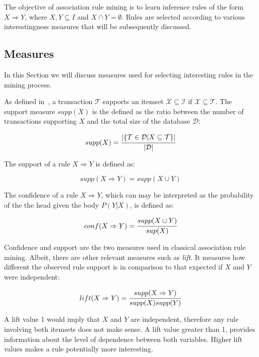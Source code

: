 The objective of association rule mining is to learn inference rules of the form $X \Rightarrow Y$, where $X,Y
\subseteq I$ and $X \cap Y = \emptyset$. Rules are selected according to various interestingness measures that will be
subsequently discussed.

\subsection{Measures}

In this Section we will discuss measures used for selecting interesting rules in the mining process.

As defined in~\citet{Agrawal:1993:MAR:170036.170072}, a transaction $\mathcal{T}$ supports an itemset
$\mathcal{X} \subseteq \mathcal{I}$ if $\mathcal{X} \subseteq
\mathcal{T}$. The support measure $supp(X)$ is the defined as the ratio between the number of transactions supporting
$X$ and the total size of the database $\mathcal{D}$:

\begin{equation}
 supp(X)=\cfrac{|\{ \mathcal{T} \in \mathcal{D} | X \subseteq \mathcal{T} \}|}{|\mathcal{D}|}
\end{equation}

The support of a rule $X \Rightarrow Y$ is defined as:

\begin{equation}
 supp(X \Rightarrow Y)=supp(X \cup Y)
\end{equation}

The confidence of a rule $X \Rightarrow Y$, which can may be interpreted as the probability of the the head given the
body $P(Y|X)$, is defined as:

\begin{equation}
 conf(X \Rightarrow Y)=\cfrac{supp(X \cup Y)}{sup(X)}
\end{equation}

Confidence and support are the two measures used in classical association rule mining. Albeit, there are other
relevant
measures such as \emph{lift}. It measures how different the observed rule support is in comparison to that expected if
$X$ and $Y$ were independent:

\begin{equation}
 lift(X \Rightarrow Y)=\cfrac{supp(X \Rightarrow Y)}{supp(X)supp(Y)}
\end{equation}

A lift value 1 would imply that $X$ and $Y$ are independent, therefore any rule involving both itemsets does not make
sense. A lift value greater than 1, provides information about the level of dependence between both variables. Higher
lift values makes a rule potentially more interesting.

